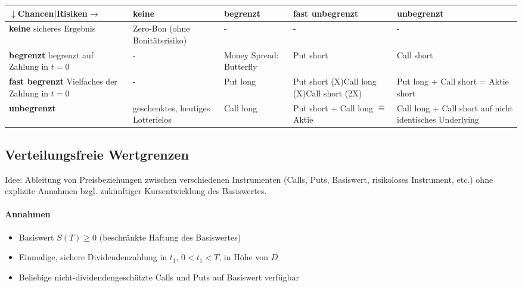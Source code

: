 \begin{tabularx}{\columnwidth}{|X|X|X|X|X|}
	\hline
	\textbf{\(\downarrow\)Chancen|Risiken\(\rightarrow\)} & \textbf{keine} & \textbf{begrenzt} & \textbf{fast unbegrenzt} & \textbf{unbegrenzt} \\
	\hline
	\textbf{keine} \newline sicheres Ergebnis & Zero-Bon (ohne Bonitätsrisiko) & - & - & - \\
	\hline
	\textbf{begrenzt} \newline begrenzt auf Zahlung in \(t=0\) & - & Money Spread: Butterfly & Put short & Call short \\
	\hline
	\textbf{fast begrenzt} \newline Vielfaches der Zahlung in \(t=0\) & - & Put long & Put short (X)\newline Call long (X)\newline Call short (2X) & Put long + Call short = Aktie short \\
	\hline
	\textbf{unbegrenzt} & geschenktes, heutiges Lotterielos & Call long & Put short + Call long \(\hat{=}\) Aktie & Call long + Call short auf nicht identisches Underlying \\
	\hline
\end{tabularx}


\subsection{Verteilungsfreie Wertgrenzen}
Idee: Ableitung von Preisbeziehungen zwischen verschiedenen Instrumenten (Calls, Puts, Basiswert, risikoloses Instrument, etc.) ohne explizite Annahmen bzgl. zukünftiger Kursentwicklung des Basiswertes.

\paragraph{Annahmen}
\begin{itemize}
	\item Basiswert \(S(T) \ge 0\) (beschränkte Haftung des Basiswertes)
	\item Einmalige, sichere Dividendenzahlung in \(t_1\), \(0 < t_1 < T\), in Höhe von \(D\)
	\item Beliebige nicht-dividendengeschützte Calls und Puts auf Basiswert verfügbar
\end{itemize}

